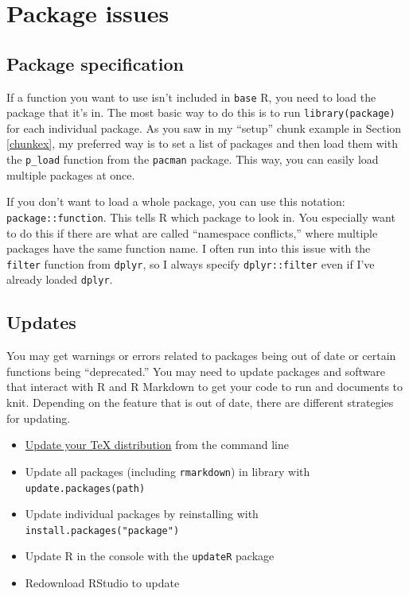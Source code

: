 \documentclass[
  openany]{book}
\providecommand{\tightlist}{%
  \setlength{\itemsep}{0pt}\setlength{\parskip}{0pt}}
\begin{document}
\hypertarget{package-issues}{%
\section{Package issues}\label{package-issues}}

\hypertarget{package-specification}{%
\subsection{Package specification}\label{package-specification}}

If a function you want to use isn't included in \texttt{base} R, you need to load the package that it's in. The most basic way to do this is to run \texttt{library(package)} for each individual package. As you saw in my ``setup'' chunk example in Section \ref{chunkex}, my preferred way is to set a list of packages and then load them with the \texttt{p\_load} function from the \texttt{pacman} package. This way, you can easily load multiple packages at once.

If you don't want to load a whole package, you can use this notation: \texttt{package::function}. This tells R which package to look in. You especially want to do this if there are what are called ``namespace conflicts,'' where multiple packages have the same function name. I often run into this issue with the \texttt{filter} function from \texttt{dplyr}, so I always specify \texttt{dplyr::filter} even if I've already loaded \texttt{dplyr}.

\hypertarget{updates}{%
\subsection{Updates}\label{updates}}

You may get warnings or errors related to packages being out of date or certain functions being ``deprecated.'' You may need to update packages and software that interact with R and R Markdown to get your code to run and documents to knit. Depending on the feature that is out of date, there are different strategies for updating.

\begin{itemize}
\tightlist
\item
  \href{https://tex.stackexchange.com/questions/55437/how-do-i-update-my-tex-distribution}{Update your TeX distribution} from the command line
\item
  Update all packages (including \texttt{rmarkdown}) in library with \texttt{update.packages(path)}
\item
  Update individual packages by reinstalling with \texttt{install.packages("package")}
\item
  Update R in the console with the \texttt{updateR} package
\item
  Redownload RStudio to update
\end{itemize}
\end{document}
